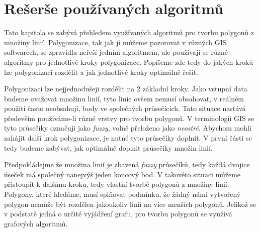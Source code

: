 \chapter{Rešerše používaných algoritmů}
\label{chap:reserzepouzivanychalgoritmu}
	Tato kapitola se zabývá přehledem využívaných algoritmů pro tvorbu polygonů z množiny linií. Polygonizace, tak jak jí můžeme pozorovat v různých GIS softwarech, se zpravidla neřeší jedním algoritmem, ale používají se různé algoritmy pro jednotlivé kroky polygonizace. Popíšeme zde tedy do jakých kroků lze polygonizaci rozdělit a jak jednotlivé kroky optimálně řešit.

	Polygonizaci lze nejjednodušeji rozdělit na 2 základní kroky. Jako vstupní data budeme uvažovat množinu linií, tyto linie ovšem nemusí obsahovat, v reálném použití často neobsahují, body ve společných průsečících. Tato situace nastává především použiváme-li různé vrstvy pro tvorbu polygonů. V terminologii GIS se tyto průsečíky označují jako \textit{fuzzy}, volně přeloženo jako \textit{neostré}. Abychom mohli zahájit další krok polygonizace, je nutné tyto průsečíky doplnit. V první části se tedy budeme zabývat, jak optimálně doplnit průsečíky množin linií.
	
	Předpokládejme že množina linií je zbavená \textit{fuzzy} průsečíků, tedy každá dvojice úseček má společný nanejvýš jeden koncový bod. V takovéto situaci můžeme přistoupit k dalšímu kroku, tedy vlastní tvorbě polygonů z množiny linií. Polygony, které hledáme, musí splňovat podmínku, že žádný námi vytvořený polygon nemůže být rozdělen jakoukoliv linií na více menších polygonů. Jelikož se v podstatě jedná o určité vyjádření grafu, pro tvorbu polygonů se využívá grafových algoritmů.
	

